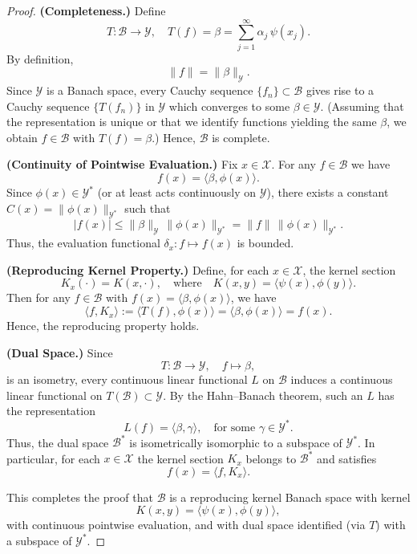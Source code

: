 \begin{proof}
\textbf{(Completeness.)}  
Define
\[
T:\mathcal{B}\to \mathcal{Y},\quad T(f)= \beta = \sum_{j=1}^\infty \alpha_j\, \psi(x_j).
\]
By definition,
\[
\|f\| = \|\beta\|_{\mathcal{Y}}.
\]
Since $\mathcal{Y}$ is a Banach space, every Cauchy sequence $\{f_n\}\subset \mathcal{B}$ gives rise to a Cauchy sequence $\{T(f_n)\}$ in $\mathcal{Y}$ which converges to some $\beta\in \mathcal{Y}$. (Assuming that the representation is unique or that we identify functions yielding the same $\beta$, we obtain $f\in \mathcal{B}$ with $T(f)=\beta$.) Hence, $\mathcal{B}$ is complete.

\medskip

\textbf{(Continuity of Pointwise Evaluation.)}  
Fix $x\in\mathcal{X}$. For any $f\in\mathcal{B}$ we have
\[
f(x)= \langle \beta, \phi(x)\rangle.
\]
Since $\phi(x)\in \mathcal{Y}^*$ (or at least acts continuously on $\mathcal{Y}$), there exists a constant $C(x)=\|\phi(x)\|_{\mathcal{Y}^*}$ such that
\[
|f(x)| \le \|\beta\|_{\mathcal{Y}}\, \|\phi(x)\|_{\mathcal{Y}^*} = \|f\|\, \|\phi(x)\|_{\mathcal{Y}^*}.
\]
Thus, the evaluation functional $\delta_x: f\mapsto f(x)$ is bounded.

\medskip

\textbf{(Reproducing Kernel Property.)}  
Define, for each $x\in\mathcal{X}$, the kernel section
\[
K_x(\cdot)= K(x,\cdot), \quad \text{where} \quad K(x,y)= \langle \psi(x), \phi(y)\rangle.
\]
Then for any $f\in\mathcal{B}$ with $f(x)= \langle \beta, \phi(x)\rangle$, we have
\[
\langle f, K_x \rangle := \langle T(f), \phi(x) \rangle = \langle \beta, \phi(x)\rangle = f(x).
\]
Hence, the reproducing property holds.

\medskip

\textbf{(Dual Space.)}  
Since
\[
T:\mathcal{B}\to \mathcal{Y},\quad f\mapsto \beta,
\]
is an isometry, every continuous linear functional $L$ on $\mathcal{B}$ induces a continuous linear functional on $T(\mathcal{B})\subset \mathcal{Y}$. By the Hahn--Banach theorem, such an $L$ has the representation
\[
L(f)= \langle \beta, \gamma \rangle, \quad \text{for some } \gamma\in \mathcal{Y}^*.
\]
Thus, the dual space $\mathcal{B}^*$ is isometrically isomorphic to a subspace of $\mathcal{Y}^*$. In particular, for each $x\in \mathcal{X}$ the kernel section $K_x$ belongs to $\mathcal{B}^*$ and satisfies
\[
f(x)= \langle f, K_x\rangle.
\]

This completes the proof that $\mathcal{B}$ is a reproducing kernel Banach space with kernel
\[
K(x,y)= \langle \psi(x), \phi(y)\rangle,
\]
with continuous pointwise evaluation, and with dual space identified (via $T$) with a subspace of $\mathcal{Y}^*$.
\end{proof}


